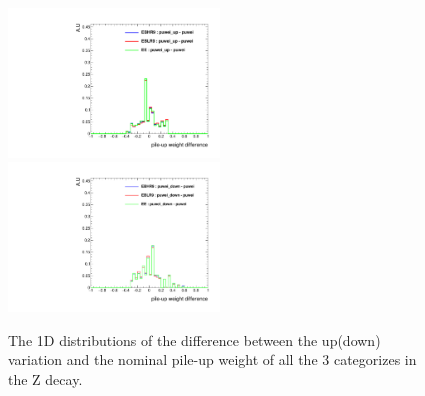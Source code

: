  \begin{figure}[!ht]
	  \begin{center}
	    \includegraphics[width=0.50\textwidth]{Fig/puwei_check/puweiup_diff}~
	    \includegraphics[width=0.50\textwidth]{Fig/puwei_check/puweidown_diff}\\
	    \bigskip
	    \caption{The 1D distributions of the difference between the up(down) variation and the nominal pile-up weight of all the 3 categorizes in the Z decay.}
	  \label{fig:puweidiff1D}
	  \end{center}
	    \end{figure}
	
